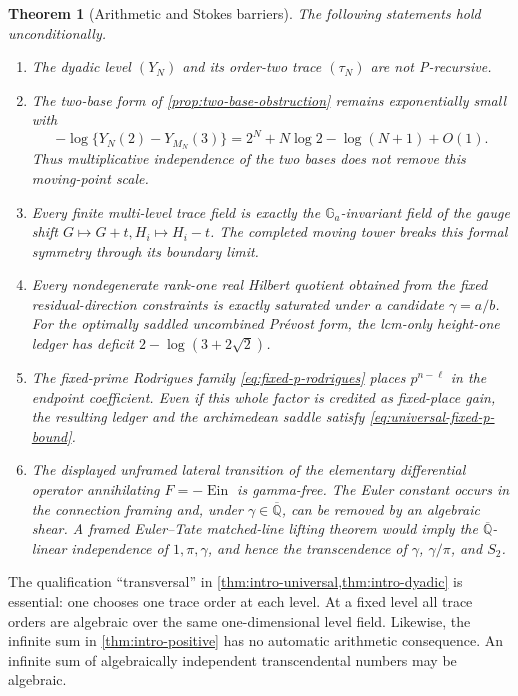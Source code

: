 \documentclass[11pt]{article}
\theoremstyle{keio}
\newtheorem{theorem}{Theorem}[section]
\theoremstyle{definition}
\theoremstyle{remark}
\newcommand{\Qbar}{\overline{\mathbb Q}}
\newcommand{\Ein}{\operatorname{Ein}}
\begin{document}
\begin{theorem}[Arithmetic and Stokes barriers]
\label{thm:intro-new-barriers}
The following statements hold unconditionally.
\begin{enumerate}[label=\textup{(\roman*)}]
 \item The dyadic level \((Y_N)\) and its order-two trace \((\tau_N)\) are
 not P-recursive.
 \item The two-base form of \cref{prop:two-base-obstruction} remains
 exponentially small with
 \[
  -\log\{Y_N(2)-Y_{M_N}(3)\}
  =2^N+N\log2-\log(N+1)+O(1).
 \]
 Thus multiplicative independence of the two bases does not remove this
 moving-point scale.
 \item Every finite multi-level trace field is exactly the
 \(\mathbb G_a\)-invariant field of the gauge shift
 \(G\mapsto G+t,H_i\mapsto H_i-t\).  The completed moving tower breaks this
 formal symmetry through its boundary limit.
 \item Every nondegenerate rank-one real Hilbert quotient obtained from the
 fixed residual-direction constraints is exactly saturated under a candidate
 \(\gamma=a/b\).  For the optimally saddled uncombined Pr\'evost form, the
 lcm-only height-one ledger has deficit
 \(2-\log(3+2\sqrt2)\).
 \item The fixed-prime Rodrigues family \eqref{eq:fixed-p-rodrigues}
 places \(p^{n-\ell}\) in the endpoint coefficient.  Even if this whole
 factor is credited as fixed-place gain, the resulting ledger and the
 archimedean saddle satisfy \eqref{eq:universal-fixed-p-bound}.
 \item The displayed unframed lateral transition of the elementary
 differential operator annihilating \(F=-\Ein\) is gamma-free.  The Euler
 constant occurs in the connection framing and, under
 \(\gamma\in\Qbar\), can be removed by an algebraic shear.  A framed
 Euler--Tate matched-line lifting theorem would imply the
 \(\Qbar\)-linear independence of \(1,\pi,\gamma\), and hence the
 transcendence of \(\gamma\), \(\gamma/\pi\), and \(S_2\).
\end{enumerate}
\end{theorem}

The qualification ``transversal'' in
\cref{thm:intro-universal,thm:intro-dyadic} is essential: one chooses one
trace order at each level.  At a fixed level all trace orders are algebraic
over the same one-dimensional level field.  Likewise, the infinite sum in
\cref{thm:intro-positive} has no automatic arithmetic consequence.  An
infinite sum of algebraically independent transcendental numbers may be
algebraic.
\end{document}
